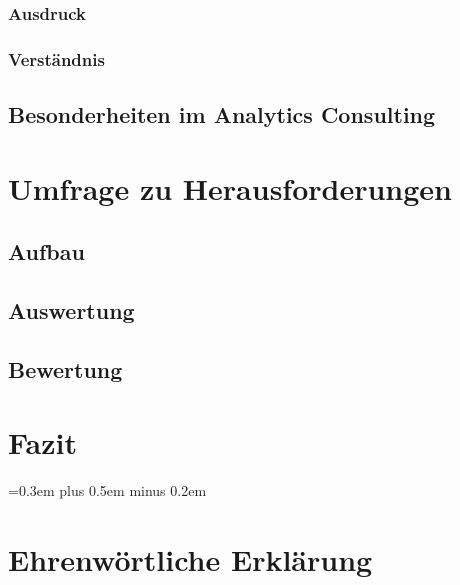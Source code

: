 \documentclass[
	12pt, %
	a4paper,
	bibliography=totoc, %
	numbers=noenddot, %
	ngerman, %
	headsepline, %
	oneside %
	]{scrbook} %
\begin{document}
\subsection{Ausdruck}\label{subsec:umgebung}


\subsection{Verständnis}\label{subsec:verstaendins}


\section{Besonderheiten im Analytics Consulting}\label{sec:besonderheiten}


\chapter{Umfrage zu Herausforderungen}\label{ch:umfrage}


\section{Aufbau}\label{sec:aufbau}


\section{Auswertung}\label{sec:auswertung}


\section{Bewertung}\label{sec:bewertung}



\chapter{Fazit}\label{ch:fazit}


\spaceskip=0.3em plus 0.5em minus 0.2em
\printbibliography{}


\chapter*{Ehrenwörtliche Erklärung}

\end{document}
